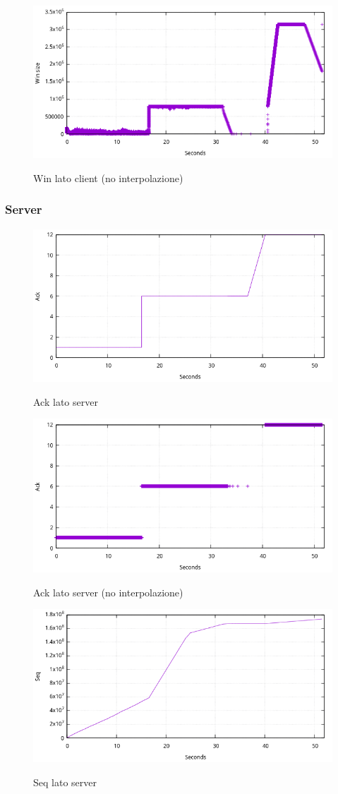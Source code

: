 \documentclass[12pt]{article}
\begin{document}
\begin{figure}[H]
	\center
	\includegraphics[width=0.75\linewidth]{client_win_point.png}
	\label{eth}
	\caption{Win lato client (no interpolazione)}
\end{figure}

\subsubsection{Server}
\begin{figure}[H]
	\center
	\includegraphics[width=0.75\linewidth]{server_ack_lines.png}
	\label{eth}
	\caption{Ack lato server}
\end{figure}

\begin{figure}[H]
	\center
	\includegraphics[width=0.75\linewidth]{server_ack_point.png}
	\label{eth}
	\caption{Ack lato server (no interpolazione)}
\end{figure}

\begin{figure}[H]
	\center
	\includegraphics[width=0.75\linewidth]{server_seq_lines.png}
	\label{eth}
	\caption{Seq lato server}
\end{figure}
\end{document}
